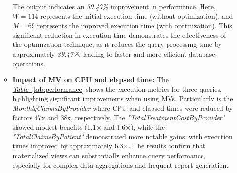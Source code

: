 \begin{enumerate}
\begin{itemize}


\vspace{.4cm}

The output indicates an \textit{39.47\% }improvement in performance. Here, \( W = 114 \) represents the initial execution time (without optimization), and \( M = 69 \) represents the improved execution time (with optimization). This significant reduction in execution time demonstrates the effectiveness of the optimization technique, as it reduces the query processing time by approximately \textit{39.47\%}, leading to faster and more efficient database operations.\vspace{.4cm}

\item \textbf{Impact of MV on CPU and elapsed time:} The \hyperref[tab:performance]{\textit{Table}~\ref*{tab:performance}} shows the execution metrics for three queries, highlighting significant improvements when using MVs. Particularly is the \textit{MonthlyClaimsByProvider} where CPU and elapsed times were reduced by factors 47x and 38x, respectively. The \textit{"TotalTreatmentCostByProvider"} showed modest benefits (1.1× and 1.6×), while the  \textit{"TotalClaimsByPatient"} demonstrated more notable gains, with execution times improved by approximately 6.3×. The results confirm that materialized views can substantially enhance query performance, especially for complex data aggregations and frequent report generation.





%






\end{itemize}
\end{enumerate}
